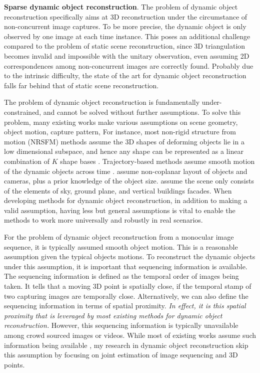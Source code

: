 \textbf{Sparse dynamic object reconstruction}.
The problem of dynamic object reconstruction specifically aims at 3D reconstruction under the circumstance of non-concurrent image captures. To be more precise, the dynamic object is only observed by one image at each time instance. This poses an additional challenge compared to the problem of static  scene reconstruction, since 3D triangulation becomes invalid and impossible with the unitary observation, even assuming 2D correspondences among non-concurrent images are correctly found. Probably due to the intrinsic difficulty, the state of the art for dynamic object reconstruction falls far behind that of static scene reconstruction.

The problem of dynamic object reconstruction is fundamentally under-constrained, and cannot be solved without further assumptions. To solve this problem, many existing works make various assumptions on scene geometry, object motion, capture pattern, \etc For instance, most non-rigid structure from motion (NRSFM) methods assume the 3D shapes of deforming objects lie in a low dimensional subspace, and hence any shape can be represented as a linear combination of $K$ shape bases \cite{Bregler_CVPR2000,torresani2008nonrigid,dai2014simple}. Trajectory-based methods assume smooth motion of the dynamic objects across time \cite{Akhter_NIPS08}. \citet{bao2011toward} assume non-coplanar layout of objects and cameras, plus a prior knowledge of the object size.  
\citet{Hoiem_CGRAPH2005} assume the scene only consists of the elements of sky, ground plane, and vertical buildings facades.
When developing methods for dynamic object reconstruction, in addition to making a valid assumption, having less but general assumptions is vital to enable the methods to work more universally and robustly in real scenarios. 

For the problem of dynamic object reconstruction from a monocular image sequence, it is typically assumed smooth object motion. This is a reasonable assumption given the typical objects motions. To reconstruct the dynamic objects under this assumption, it is important that sequencing information is available. The sequencing information is defined as the temporal order of images being taken. It tells that a moving 3D point is spatially close, if the temporal stamp of two capturing images are temporally close. Alternatively, we can also define the sequencing information in terms of spatial proximity. \emph{In effect, it is this spatial proximity that is leveraged by most existing methods for dynamic object reconstruction.} However, this sequencing information is typically unavailable among crowd sourced images or videos. While most of existing works assume such information being available \cite{Park_ECCV2010,Park_ICCV2011,Valmadre_ECCV2012,Valmadre_CVPR2012}, my research in dynamic object reconstruction skip this assumption by focusing on joint estimation of image sequencing and 3D points.

